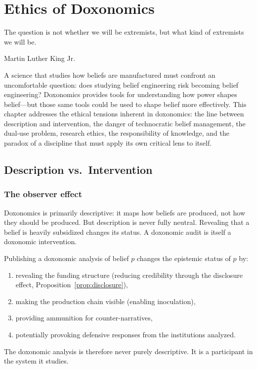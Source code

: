 \chapter{Ethics of Doxonomics}
\label{ch:ethics}

\epigraph{The question is not whether we will be extremists, but what kind of extremists we will be.}{Martin Luther King Jr.}

\noindent
A science that studies how beliefs are manufactured must confront an uncomfortable question: does studying belief engineering risk becoming belief engineering?
Doxonomics provides tools for understanding how power shapes belief---but those same tools could be used to shape belief more effectively.
This chapter addresses the ethical tensions inherent in doxonomics: the line between description and intervention, the danger of technocratic belief management, the dual-use problem, research ethics, the responsibility of knowledge, and the paradox of a discipline that must apply its own critical lens to itself.

\section{Description vs.\ Intervention}
\label{sec:ch34-description}

\subsection{The observer effect}

Doxonomics is primarily descriptive: it maps how beliefs are produced, not how they should be produced.
But description is never fully neutral.
Revealing that a belief is heavily subsidized changes its status.
A doxonomic audit is itself a doxonomic intervention.

\begin{proposition}
\label{prop:observer-effect}
Publishing a doxonomic analysis of belief $p$ changes the epistemic status of $p$ by:
\begin{enumerate}[nosep]
  \item revealing the funding structure (reducing credibility through the disclosure effect, Proposition~\ref{prop:disclosure}),
  \item making the production chain visible (enabling inoculation),
  \item providing ammunition for counter-narratives,
  \item potentially provoking defensive responses from the institutions analyzed.
\end{enumerate}
The doxonomic analysis is therefore never purely descriptive.
It is a participant in the system it studies.
\end{proposition}

